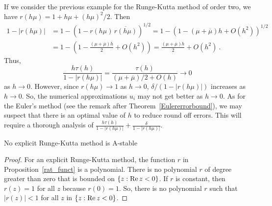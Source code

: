 \begin{rmk}
If we consider the previous example for the Runge-Kutta method of
order two, we have $r(h\mu) = 1 + h\mu + (h\mu)^2/2$.  Then
\begin{align*}
1 - |r(h\mu)|
&= 1 - \left( 1 - r(h\mu)\,\overline{r(h\mu)} \right)^{1/2}
= 1 - \left( 1 - (\mu + \overline{\mu})h + O(h^2)\right)^{1/2} \\
&= 1 - \left( 1 - \frac{(\mu + \overline{\mu})h}{2} + O(h^2)\right)
= \frac{(\mu + \overline{\mu})h}{2} + O(h^2) \ .
\end{align*}
Thus,
\[
\frac{h\tau(h)}{1-|r(h\mu)|}
= \frac{\tau(h)}{(\mu + \overline{\mu})/2 + O(h)} \to 0
\]
as $h\to 0$.  However, since $r(h\mu) \to 1$ as $h \to 0$, 
$\delta/(1-|r(h\mu)|)$ increases as $h\to 0$.  So, the numerical
approximations $u_i$ may not get better as $h \to 0$.  As for the
Euler's method (see the remark after Theorem~\ref{Eulererrorbound}),
we may suspect that there is an optimal value of $h$ to reduce
round off errors.  This will require a thorough analysis of
$\displaystyle \frac{h\tau(h)}{1-|r(h\mu)|} + \frac{\delta}{1-|r(h\mu)|}$.
\end{rmk}

\begin{cor}
No explicit Runge-Kutta method is A-stable
\end{cor}

\begin{proof}
For an explicit Runge-Kutta method, the function $r$ in
Proposition~\ref{rat_funct} is a polynomial.  There is no polynomial $r$ of
degree greater than zero that is bounded on
$\{ z : \operatorname{Re} z < 0 \}$.  If $r$ is constant, then
$r(z) = 1$ for all $z$ because $r(0)=1$.  So, there is no polynomial
$r$ such that $|r(z)| < 1$ for all $z$ in $\{ z : \operatorname{Re} z < 0 \}$.
\end{proof}


